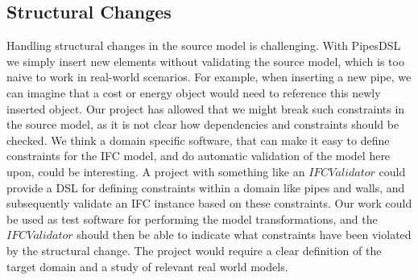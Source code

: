\subsection{Structural Changes}
Handling structural changes in the source model is challenging. With PipesDSL we simply insert new elements without validating the source model, which is too naive to work in real-world scenarios. For example, when inserting a new pipe, we can imagine that a cost or energy object would need to reference this newly inserted object. Our project has allowed that we might break such constraints in the source model, as it is not clear how dependencies and constraints should be checked. We think a domain specific software, that can make it easy to define constraints for the IFC model, and do automatic validation of the model here upon, could be interesting. A project with something like an $IFC Validator$ could provide a DSL for defining constraints within a domain like pipes and walls, and subsequently validate an IFC instance based on these constraints. Our work could be used as test software for performing the model transformations, and the $IFC Validator$ should then be able to indicate what constraints have been violated by the structural change. The project would require a clear definition of the target domain and a study of relevant real world models.
